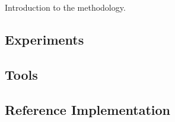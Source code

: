Introduction to the methodology.

\subsection{Experiments}

\subsection{Tools}
\subsection{Reference Implementation}
